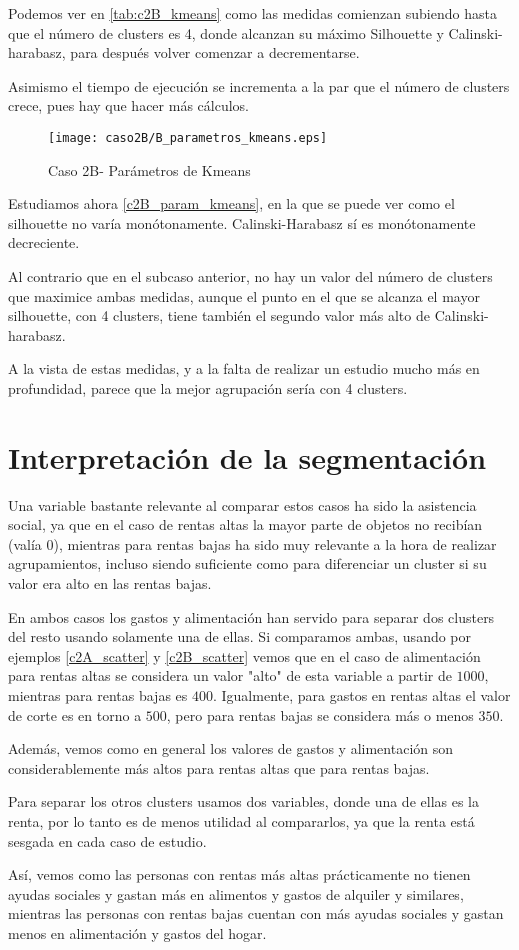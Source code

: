 Podemos ver en \eqref{tab:c2B_kmeans} como las medidas comienzan subiendo hasta que el número de clusters es 4, donde alcanzan su máximo Silhouette y Calinski-harabasz, para después volver comenzar a decrementarse.

Asimismo el tiempo de ejecución se incrementa a la par que el número de clusters crece, pues hay que hacer más cálculos.

\begin{figure}[H]
\caption{Caso 2B- Parámetros de Kmeans}
\label{c2B_param_kmeans}
\texttt{[image: caso2B/B\_parametros\_kmeans.eps]}
\end{figure}

Estudiamos ahora \eqref{c2B_param_kmeans}, en la que se puede ver como el silhouette no varía monótonamente. Calinski-Harabasz sí es monótonamente decreciente.

Al contrario que en el subcaso anterior, no hay un valor del número de clusters que maximice ambas medidas, aunque el punto en el que se alcanza el mayor silhouette, con 4 clusters, tiene también el segundo valor más alto de Calinski-harabasz.

A la vista de estas medidas, y a la falta de realizar un estudio mucho más en profundidad, parece que la mejor agrupación sería con 4 clusters.


\section{Interpretación de la segmentación}

Una variable bastante relevante al comparar estos casos ha sido la asistencia social, ya que en el caso de rentas altas la mayor parte de objetos no recibían (valía 0), mientras para rentas bajas ha sido muy relevante a la hora de realizar agrupamientos, incluso siendo suficiente como para diferenciar un cluster si su valor era alto en las rentas bajas.

En ambos casos los gastos y alimentación han servido para separar dos clusters del resto usando solamente una de ellas. Si comparamos ambas, usando por ejemplos \eqref{c2A_scatter} y \eqref{c2B_scatter} vemos que en el caso de alimentación para rentas altas se considera un valor "alto" de esta variable a partir de $1000$, mientras para rentas bajas es $400$. Igualmente, para gastos en rentas altas el valor de corte es en torno a $500$, pero para rentas bajas se considera más o menos $350$.

Además, vemos como en general los valores de gastos y alimentación son considerablemente más altos para rentas altas que para rentas bajas.

Para separar los otros clusters usamos dos variables, donde una de ellas es la renta, por lo tanto es de menos utilidad al compararlos, ya que la renta está sesgada en cada caso de estudio.

Así, vemos como las personas con rentas más altas prácticamente no tienen ayudas sociales y gastan más en alimentos y gastos de alquiler y similares, mientras las personas con rentas bajas cuentan con más ayudas sociales y gastan menos en alimentación y gastos del hogar.




